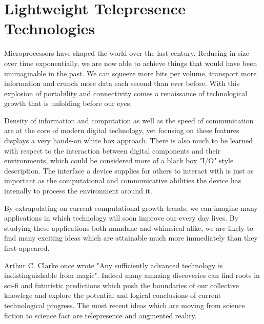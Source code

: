 \documentclass[a4paper,12pt]{report}
\begin{document}
\chapter{Lightweight Telepresence Technologies}

Microprocessors have shaped the world over the last century. Reducing in size over time exponentially, we are now able to achieve things that would have been unimaginable in the past. We can squeeze more bits per volume, transport more information and crunch more data each second than ever before. With this explosion of portability and connectivity comes a renaissance of technological growth that is unfolding before our eyes.

Density of information and computation as well as the speed of communication are at the core of modern digital technology, yet focusing on these features displays a very hands-on white box approach. There is also much to be learned with respect to the interaction between digital components and their environments, which could be considered more of a black box "I/O" style description. The interface a device supplies for others to interact with is just as important as the computational and communicative abilities the device has intenally to process the environment around it.

By extrapolating on current computational growth trends, we can imagine many applications in which technology will soon improve our every day lives. By studying these applications both mundane and whimsical alike, we are likely to find many exciting ideas which are attainable much more immediately than they first appeared.

Arthur C. Clarke once wrote "Any sufficiently advanced technology is indistinguishable from magic". Indeed many amazing discoveries can find roots in sci-fi and futuristic predictions which push the boundaries of our collective knowlege and explore the potential and logical conclusions of current technological progress. The most recent ideas which are moving from science fiction to science fact are telepresence and augmented reality. 
\end{document}
